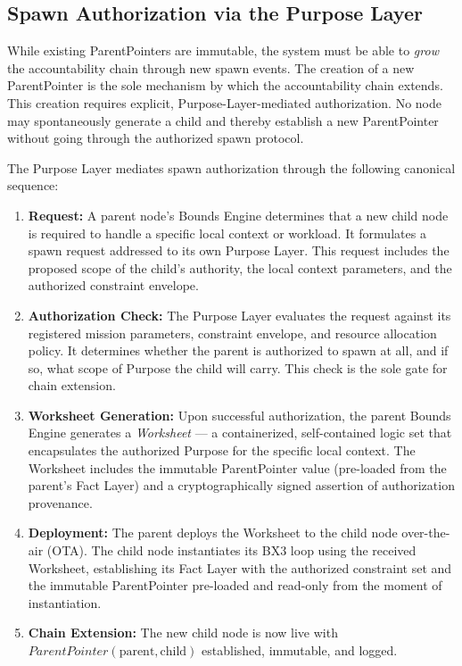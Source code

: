 \subsection{Spawn Authorization via the Purpose Layer}
\label{sec:spawn-auth}

While existing ParentPointers are immutable, the system must be able to \textit{grow} the accountability chain through new spawn events. The creation of a new ParentPointer is the sole mechanism by which the accountability chain extends. This creation requires explicit, Purpose-Layer-mediated authorization. No node may spontaneously generate a child and thereby establish a new ParentPointer without going through the authorized spawn protocol.

The Purpose Layer mediates spawn authorization through the following canonical sequence:

\begin{enumerate}[noitemsep]
    \item \textbf{Request:} A parent node's Bounds Engine determines that a new child node is required to handle a specific local context or workload. It formulates a spawn request addressed to its own Purpose Layer. This request includes the proposed scope of the child's authority, the local context parameters, and the authorized constraint envelope.
    \item \textbf{Authorization Check:} The Purpose Layer evaluates the request against its registered mission parameters, constraint envelope, and resource allocation policy. It determines whether the parent is authorized to spawn at all, and if so, what scope of Purpose the child will carry. This check is the sole gate for chain extension.
    \item \textbf{Worksheet Generation:} Upon successful authorization, the parent Bounds Engine generates a \textit{Worksheet} --- a containerized, self-contained logic set that encapsulates the authorized Purpose for the specific local context. The Worksheet includes the immutable ParentPointer value (pre-loaded from the parent's Fact Layer) and a cryptographically signed assertion of authorization provenance.
    \item \textbf{Deployment:} The parent deploys the Worksheet to the child node over-the-air (OTA). The child node instantiates its BX3 loop using the received Worksheet, establishing its Fact Layer with the authorized constraint set and the immutable ParentPointer pre-loaded and read-only from the moment of instantiation.
    \item \textbf{Chain Extension:} The new child node is now live with $\textit{ParentPointer}(\text{parent}, \text{child})$ established, immutable, and logged.
\end{enumerate}

